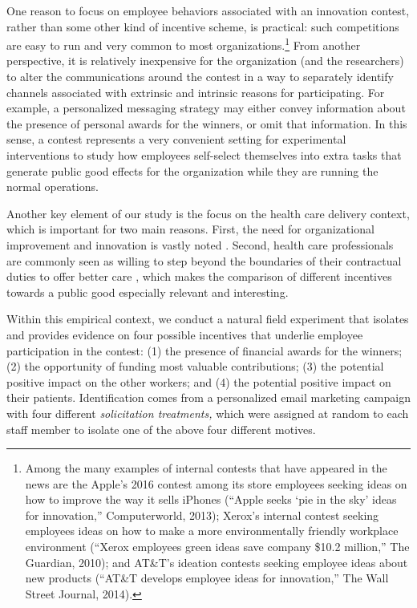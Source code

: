 \documentclass[11pt, titlepage]{article}
\begin{document}
One reason to focus on employee behaviors associated with an innovation
contest, rather than some other kind of incentive scheme, is practical:
such competitions are easy to run and very common to most
organizations.\footnote{Among the many examples of internal contests
  that have appeared in the news are the Apple's 2016 contest among its
  store employees seeking ideas on how to improve the way it sells
  iPhones (``Apple seeks `pie in the sky' ideas for innovation,''
  Computerworld, 2013); Xerox's internal contest seeking employees ideas
  on how to make a more environmentally friendly workplace environment
  (``Xerox employees green ideas save company \$10.2 million,'' The
  Guardian, 2010); and AT\&T's ideation contests seeking employee ideas
  about new products (``AT\&T develops employee ideas for innovation,''
  The Wall Street Journal, 2014).} From another perspective, it is
relatively inexpensive for the organization (and the researchers) to
alter the communications around the contest in a way to separately
identify channels associated with extrinsic and intrinsic reasons for
participating. For example, a personalized messaging strategy may either
convey information about the presence of personal awards for the
winners, or omit that information. In this sense, a contest represents a
very convenient setting for experimental interventions to study how
employees self-select themselves into extra tasks that generate public
good effects for the organization while they are running the normal
operations.

Another key element of our study is the focus on the health care
delivery context, which is important for two main reasons. First, the
need for organizational improvement and innovation is vastly noted
\citep{cutler2012reducing}. Second, health care professionals are
commonly seen as willing to step beyond the boundaries of their
contractual duties to offer better care \citep{delfgaauw2005dedicated},
which makes the comparison of different incentives towards a public good
especially relevant and interesting.

Within this empirical context, we conduct a natural field experiment
that isolates and provides evidence on four possible incentives that
underlie employee participation in the contest: (1) the presence of
financial awards for the winners; (2) the opportunity of funding most
valuable contributions; (3) the potential positive impact on the other
workers; and (4) the potential positive impact on their patients.
Identification comes from a personalized email marketing campaign with
four different \emph{solicitation treatments,} which were assigned at
random to each staff member to isolate one of the above four different
motives.
\end{document}
